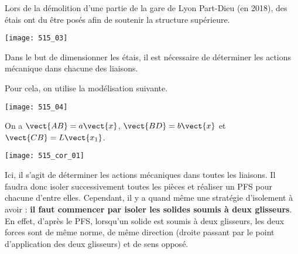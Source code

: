 \normalfalse \difficiletrue \tdifficilefalse
\correctiontrue


\setcounter{question}{0}
\ifcorrection
\else
{}
\fi


\ifprof
\else

Lors de la démolition d'une partie de la gare de Lyon Part-Dieu (en 2018), des étais ont du être posés afin de soutenir la structure supérieure. 

\begin{center}
\texttt{[image: 515\_03]}
\end{center}

Dans le but de dimensionner les étais, il est nécessaire de déterminer les actions mécanique dans chacune des liaisons. 

Pour cela, on utilise la modélisation suivante. 

\begin{center}
\texttt{[image: 515\_04]}
\end{center}

On a $\vect{AB}=a \vect{x}$,  $\vect{BD}=b \vect{x}$ et  $\vect{CB}=L \vect{x_1}$.
\fi

\ifprof

\begin{center}
\texttt{[image: 515\_cor\_01]}
\end{center}

\else
\fi

\ifprof

Ici, il s'agit de déterminer les actions mécaniques dans toutes les liaisons. Il faudra donc isoler successivement toutes les pièces et réaliser un PFS pour chacune d'entre elles. Cependant, il y a quand même une stratégie d'isolement à avoir : \textbf{il faut commencer par isoler les solides soumis à deux glisseurs}. En effet, d'après le PFS, lorsqu'un solide est soumis à deux glisseurs, les deux forces sont de même norme, de même direction (droite passant par le point d'application des deux glisseurs) et de sens opposé. 

